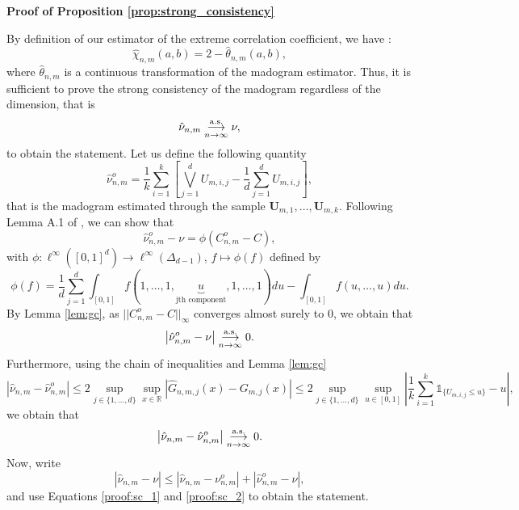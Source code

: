 \documentclass[11pt]{article}
\makeatletter
\theoremstyle{definition}
\renewenvironment{proof}[1][\proofname]{\par
\pushQED{\qed}%
\normalfont \topsep6\p@\@plus6\p@\relax
\trivlist
\item\relax
{\textbf{
#1\@addpunct{ }}}\hspace\labelsep\ignorespaces
}{%
\popQED\endtrivlist\@endpefalse
}
\makeatother
\begin{document}
	\begin{proof}[Proof of Proposition \ref{prop:strong_consistency}]
		By definition of our estimator of the extreme correlation coefficient, we have :
		\begin{equation*}
			\hat{\chi}_{n,m}(a,b) = 2 - \hat{\theta}_{n,m}(a,b),
		\end{equation*}
		where $\hat{\theta}_{n,m}$ is a continuous transformation of the madogram estimator. Thus, it is sufficient to prove the strong consistency of the madogram regardless of the dimension, that is
		\begin{equation*}
			\hat{\nu}_{n,m} \overunderset{\textrm{a.s.}}{n \rightarrow \infty}{\longrightarrow} \nu,
		\end{equation*}
		to obtain the statement. Let us define the following quantity
		\begin{equation*}
			\hat{\nu}_{n,m}^o = \frac{1}{k} \sum_{i=1}^k \left[ \bigvee_{j=1}^d U_{m,i,j} - \frac{1}{d} \sum_{j=1}^d U_{m,i,j} \right],
		\end{equation*}
		that is the madogram estimated through the sample $\textbf{U}_{m,1},\dots, \textbf{U}_{m,k}$. Following Lemma A.1 of \cite{MARCON20171}, we can show that
		\begin{equation*}
			\hat{\nu}_{n,m}^o - \nu = \phi(C_{n,m}^o - C),
		\end{equation*}
		with $\phi : \ell^{\infty}([0,1]^d) \rightarrow \ell^\infty(\Delta_{d-1})$, $f \mapsto \phi(f)$ defined by
		\begin{equation*}
			\phi(f) = \frac{1}{d} \sum_{j=1}^d \int_{[0,1]} f(1,\dots,1,\underbrace{u}_{\textrm{jth component}},1,\dots,1)du - \int_{[0,1]} f(u,\dots,u)du.
		\end{equation*}
		By Lemma \ref{lem:gc}, as $||C_{n,m}^o - C||_{\infty}$ converges almost surely to $0$, we obtain that
		\begin{equation}
			\label{proof:sc_1}
			\left| \hat{\nu}_{n,m}^o - \nu \right| \overunderset{\textrm{a.s.}}{n \rightarrow \infty}{\longrightarrow} 0.
		\end{equation}
		Furthermore, using the chain of inequalities and Lemma \ref{lem:gc}
		\begin{equation*}
			\left| \hat{\nu}_{n,m} - \hat{\nu}^o_{n,m} \right| \leq 2 \underset{j \in \{1,\dots,d\}}{\sup} \underset{x \in \mathbb{R}}{\sup} \left| \hat{G}_{n,m,j}(x) - G_{m,j}(x) \right| \leq 2 \underset{j \in \{1,\dots,d\}}{\sup} \underset{u \in [0,1]}{\sup} \left| \frac{1}{k} \sum_{i=1}^k \mathds{1}_{ \{ U_{m,i,j} \leq u \}} - u \right|,
		\end{equation*}
		we obtain that
		\begin{equation}
			\label{proof:sc_2}
			\left| \hat{\nu}_{n,m} - \hat{\nu}^o_{n,m} \right| \overunderset{\textrm{a.s.}}{n \rightarrow \infty}{\longrightarrow} 0.
		\end{equation}
		Now, write
		\begin{equation*}
			\left| \hat{\nu}_{n,m} - \nu \right| \leq \left| \hat{\nu}_{n,m} - \nu_{n,m}^o \right| + \left| \hat{\nu}_{n,m}^o - \nu \right|,
		\end{equation*}
		and use Equations \eqref{proof:sc_1} and \eqref{proof:sc_2} to obtain the statement.
	\end{proof}
	
\end{document}
